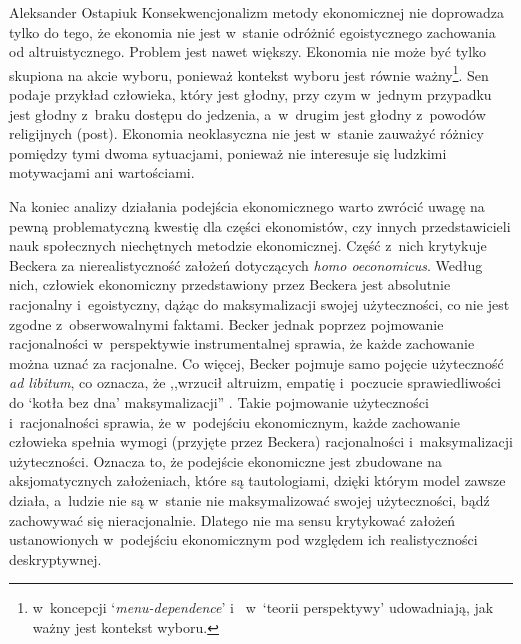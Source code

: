 \begin{artplenv}{Aleksander Ostapiuk}
Konsekwencjonalizm metody ekonomicznej nie doprowadza tylko do tego, że ekonomia nie jest w~stanie odróżnić
egoistycznego zachowania od altruistycznego. Problem jest nawet większy. Ekonomia nie może być tylko skupiona na akcie
wyboru, ponieważ kontekst wyboru jest równie ważny\footnote{%
\parencite[s.~130]{sen_rationality_2002}
w~koncepcji
`\textit{menu-dependence}' i~\parencite{kahneman_prospect_1979}
w~`teorii perspektywy' udowadniają, jak
ważny jest kontekst wyboru.}. Sen
\parencite*[s.~75]{sen_development_1999}
podaje przykład człowieka, który jest głodny,
przy czym w~jednym przypadku jest głodny z~braku dostępu do jedzenia, a~w~drugim jest głodny z~powodów religijnych
(post). Ekonomia neoklasyczna nie jest w~stanie zauważyć różnicy pomiędzy tymi dwoma sytuacjami, ponieważ nie
interesuje się ludzkimi motywacjami ani wartościami.

Na koniec analizy działania podejścia ekonomicznego warto zwrócić uwagę na pewną problematyczną kwestię dla części
ekonomistów, czy innych przedstawicieli nauk społecznych niechętnych metodzie ekonomicznej. Część z~nich
krytykuje Beckera za nierealistyczność założeń dotyczących \textit{homo oeconomicus}. Według nich, człowiek ekonomiczny
przedstawiony przez Beckera jest absolutnie racjonalny i~egoistyczny, dążąc do maksymalizacji swojej użyteczności, co
nie jest zgodne z~obserwowalnymi faktami. Becker jednak poprzez pojmowanie racjonalności w~perspektywie instrumentalnej
sprawia, że każde zachowanie można uznać za racjonalne. Co więcej, Becker pojmuje samo pojęcie użyteczność \textit{ad
libitum}, co oznacza, że ,,wrzucił altruizm, empatię i~poczucie sprawiedliwości do `kotła bez dna' maksymalizacji''
\parencite[s.~74–75]{ostapiuk_moralna_2017}.
Takie pojmowanie użyteczności i~racjonalności sprawia,
że w~podejściu ekonomicznym, każde zachowanie człowieka spełnia wymogi (przyjęte przez Beckera)
racjonalności i~maksymalizacji użyteczności. Oznacza to, że podejście ekonomiczne jest zbudowane na aksjomatycznych założeniach, które
są tautologiami, dzięki którym model zawsze działa, a~ludzie nie są w~stanie nie maksymalizować swojej użyteczności,
bądź zachowywać się nieracjonalnie. Dlatego nie ma sensu krytykować założeń ustanowionych w~podejściu
ekonomicznym pod względem ich realistyczności deskryptywnej. 


\end{artplenv}
